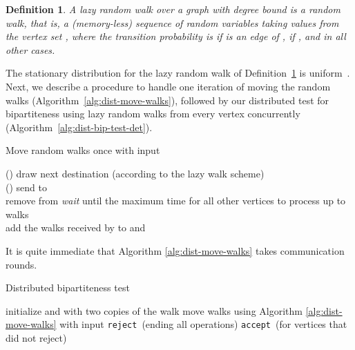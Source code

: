 \documentclass[11pt]{article}
\newtheorem{definition}[theorem]{Definition}
\newcommand{\accept}{\texttt{accept}}
\newcommand{\reject}{\texttt{reject}}
\begin{document}
\begin{definition}
\label{def:lazy-rw}
A {\em lazy} random walk over a graph  with degree bound  is a random walk, that is, a (memory-less) sequence of random variables  taking values from the vertex set , where the transition probability  is  if  is an edge of ,  if , and  in all other cases.
\end{definition}
The stationary distribution for the lazy random walk of Definition~\ref{def:lazy-rw} is uniform~\cite[Section 8]{ron2010algorithmic}.
Next, we describe a procedure to handle one iteration of moving the random walks (Algorithm~\ref{alg:dist-move-walks}), followed by our distributed test for bipartiteness using lazy random walks from every vertex concurrently (Algorithm~\ref{alg:dist-bip-test-det}).
		
\begin{algorithm}[htbp]
\caption{Move random walks once with input \label{alg:dist-move-walks}}
{
    \If(){}
    {
        {
            draw next destination  (according to the lazy walk scheme)\\
			\If(){}
            {
				send  to \\
				remove  from 
			}
		}
	}
    {\em wait} until the maximum time for all other vertices to process up to  walks\\
	add the walks received by  to  and  
}
\end{algorithm}

It is quite immediate that Algorithm \ref{alg:dist-move-walks} takes  communication rounds.
		
\begin{algorithm}[htbp]
\caption{Distributed bipartiteness test\label{alg:dist-bip-test-det}}
\Perform{}
{
    {
        initialize  and  with two copies of the walk 
    }
    \Perform{}
    {
        move walks using Algorithm \ref{alg:dist-move-walks} with input 
    }
    {
        {
            \reject ~(ending all operations) 
        }
    }
}
\accept ~(for vertices that did not reject)
\end{algorithm}
\end{document}
